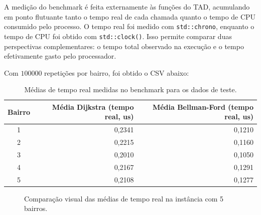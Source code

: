 \documentclass[12pt,a4paper]{article}
\begin{document}
A medição do benchmark é feita externamente às funções do TAD, acumulando em
ponto flutuante tanto o tempo real de cada chamada quanto o tempo de CPU
consumido pelo processo. O tempo real foi medido com \texttt{std::chrono},
enquanto o tempo de CPU foi obtido com \texttt{std::clock()}. Isso permite
comparar duas perspectivas complementares: o tempo total observado na execução
e o tempo efetivamente gasto pelo processador.

Com $100000$ repetições por bairro, foi obtido o CSV abaixo:

\begin{table}[h]
\centering
\begin{tabular}{crr}
\toprule
Bairro & Média Dijkstra (tempo real, us) & Média Bellman-Ford (tempo real, us) \\
\midrule
1 & 0,2341 & 0,1210 \\
2 & 0,2215 & 0,1160 \\
3 & 0,2010 & 0,1050 \\
4 & 0,2167 & 0,1291 \\
5 & 0,2108 & 0,1277 \\
\bottomrule
\end{tabular}
\caption{Médias de tempo real medidas no benchmark para os dados de teste.}
\label{tab:benchmark-pequeno}
\end{table}

\begin{figure}[h]
\centering
{}
\caption{Comparação visual das médias de tempo real na instância com 5 bairros.}
\label{fig:benchmark-pequeno}
\end{figure}
\end{document}

